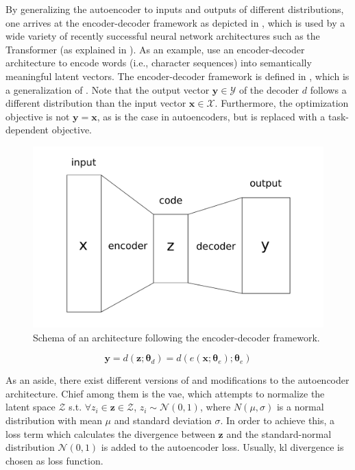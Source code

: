 By generalizing the autoencoder to inputs and outputs of different distributions, one arrives at the encoder-decoder framework \citep{DBLP:conf/nips/SutskeverVL14,FITPT283} as depicted in , which is used by a wide variety of recently successful neural network architectures such as the Transformer (as explained in ). As an example, \citet{DBLP:journals/corr/abs-1301-3781} use an encoder-decoder architecture to encode words (i.e., character sequences) into semantically meaningful latent vectors. The encoder-decoder framework is defined in , which is a generalization of . Note that the output vector $\mathbf{y}\in\mathcal{Y}$ of the decoder $d$ follows a different distribution than the input vector $\mathbf{x}\in\mathcal{X}$. Furthermore, the optimization objective is not $\mathbf{y}=\mathbf{x}$, as is the case in autoencoders, but is replaced with a task-dependent objective.

\begin{figure}
    \centering
    \includegraphics[width=\textwidth]{graphics/encoderdecoder.pdf}
    \caption{Schema of an architecture following the encoder-decoder framework.}
    \label{fig:encoderdecoder}
\end{figure}

\begin{equation}
\label{eq:encdec}
    \mathbf{y}=d(\mathbf{z};\boldsymbol{\theta}_d)=d(e(\mathbf{x};\boldsymbol{\theta}_e);\boldsymbol{\theta}_e)
\end{equation}


As an aside, there exist different versions of and modifications to the autoencoder architecture. Chief among them is the \gls{vae}, which attempts to normalize the latent space $\mathcal{Z}$ s.t. $\forall z_i\in\mathbf{z}\in\mathcal{Z}$, $z_i \sim \mathcal{N}(0,1)$, where $N(\mu,\sigma)$ is a normal distribution with mean $\mu$ and standard deviation $\sigma$. In order to achieve this, a loss term which calculates the  divergence between $\mathbf{z}$ and the standard-normal distribution $\mathcal{N}(0,1)$ is added to the autoencoder loss. Usually, \gls{kl} divergence \citep{10.1214/aoms/1177729694} is chosen as loss function.

